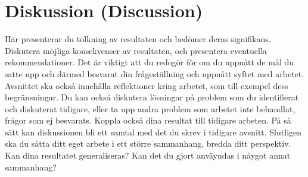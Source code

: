 \section{Diskussion (Discussion)}

H\"{a}r presenterar du tolkning av resultaten och bed\"{o}mer deras signifikans. Diskutera m\"{o}jliga konsekvenser av resultaten, och presentera eventuella rekommendationer. Det \"{a}r viktigt att du redog\"{o}r f\"{o}r om du uppn\r{a}tt de m\r{a}l du satte upp och d\"{a}rmed besvarat din fr\r{a}gest\"{a}llning och uppn\r{a}tt syftet med arbetet. Avsnittet ska ocks\r{a} inneh\r{a}lla reflektioner kring arbetet, som till exempel dess begr\"{a}nsningar.  Du kan ocks\r{a} diskutera l\"{o}sningar p\r{a} problem som du identifierat och diskuterat tidigare, eller ta upp andra problem som arbetet inte behandlat, fr\r{a}gor som ej besvarats. Koppla ocks\r{a} dina resultat till tidigare arbeten. P\r{a} s\r{a} s\"{a}tt kan diskussionen bli ett samtal med det du skrev i tidigare avsnitt.  Slutligen ska du s\"{a}tta ditt eget arbete i ett st\"{o}rre sammanhang, bredda ditt perspektiv. Kan dina resultatet generaliseras? Kan det du gjort anv\"{a}yndas i n\r{a}ygot annat sammanhang? 
